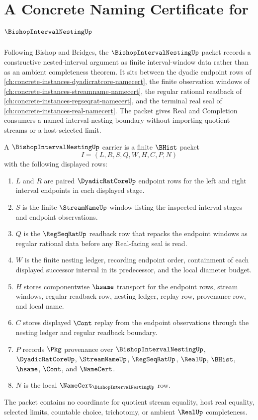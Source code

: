 \chapter{A Concrete Naming Certificate for $\BishopIntervalNestingUp$}
\label{ch:concrete-instances-bishop-interval-nesting-namecert}

Following Bishop and Bridges, the $\BishopIntervalNestingUp$ packet records a constructive nested-interval argument as finite interval-window data rather than as an ambient completeness theorem. It sits between the dyadic endpoint rows of \autoref{ch:concrete-instances-dyadicratcore-namecert}, the finite observation windows of \autoref{ch:concrete-instances-streamname-namecert}, the regular rational readback of \autoref{ch:concrete-instances-regseqrat-namecert}, and the terminal real seal of \autoref{ch:concrete-instances-real-namecert}. The packet gives Real and Completion consumers a named interval-nesting boundary without importing quotient streams or a host-selected limit.

\begin{definition}
\label{def:bishop-interval-nesting-carrier}
A $\BishopIntervalNestingUp$ carrier is a finite $\BHist$ packet
$$
I=(L,R,S,Q,W,H,C,P,N)
$$
with the following displayed rows:
\begin{enumerate}
\item $L$ and $R$ are paired $\DyadicRatCoreUp$ endpoint rows for the left and right interval endpoints in each displayed stage.
\item $S$ is the finite $\StreamNameUp$ window listing the inspected interval stages and endpoint observations.
\item $Q$ is the $\RegSeqRatUp$ readback row that repacks the endpoint windows as regular rational data before any Real-facing seal is read.
\item $W$ is the finite nesting ledger, recording endpoint order, containment of each displayed successor interval in its predecessor, and the local diameter budget.
\item $H$ stores componentwise $\hsame$ transport for the endpoint rows, stream windows, regular readback row, nesting ledger, replay row, provenance row, and local name.
\item $C$ stores displayed $\Cont$ replay from the endpoint observations through the nesting ledger and regular readback boundary.
\item $P$ records $\Pkg$ provenance over $\BishopIntervalNestingUp$, $\DyadicRatCoreUp$, $\StreamNameUp$, $\RegSeqRatUp$, $\RealUp$, $\BHist$, $\hsame$, $\Cont$, and $\NameCert$.
\item $N$ is the local $\NameCert_{\BishopIntervalNestingUp}$ row.
\end{enumerate}
The packet contains no coordinate for quotient stream equality, host real equality, selected limits, countable choice, trichotomy, or ambient $\RealUp$ completeness.
\end{definition}

